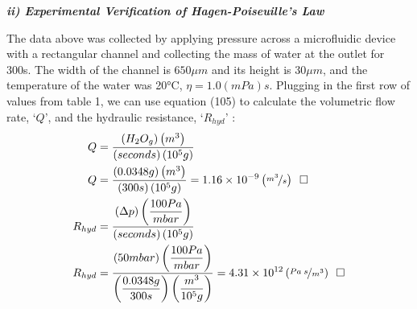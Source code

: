 \documentclass[titlepage]{article}
\begin{document}
    \newpage
    \begin{center}
        \textbf{\emph{ii) Experimental Verification of Hagen-Poiseuille’s Law}}
    \end{center}
    \begin{table}[h!]
        \centering
        \caption{\emph{Experimental Data}}
        \label{table:1}
    \end{table}
    \vspace*{0.5cm}
    \noindent The data above was collected by applying pressure across a microfluidic device with a rectangular channel and collecting the mass of water at the outlet for 300s. The width of the channel is $650$ and its height is $30$, and the temperature of the water was 20\si{\celsius}, $(mPa)s$. Plugging in the first row of values from table 1, we can use equation (105) to calculate the volumetric flow rate, `$Q$', and the hydraulic resistance, `$R_{hyd}$' :
    \begingroup
        \addtolength\jot{6pt}
        \begin{align}
            Q &= \displaystyle\frac{\left(H_{2}O_{g}\right)\left({m^3}\right)}{\left({seconds}\right)\left({10^5}g\right)} \\
            Q &= \displaystyle\frac{\left(0.0348g\right)\left(m^3\right)}{\left(300s\right)\left(10^{5}g\right)} = 1.16\times{10^{-9}} \left(\displaystyle\nicefrac{m^3}{s}\right)\hspace*{5pt}\square \\
            R_{hyd} &= \displaystyle\frac{\left(\Delta{p}\right)\left(\displaystyle\frac{100Pa}{mbar}\right)}{\left({seconds}\right)\left({10^5}g\right)}\\
            R_{hyd} &= \displaystyle\frac{\left(50mbar\right)\left(\displaystyle\frac{100Pa}{mbar}\right)}{\left(\displaystyle\frac{0.0348g}{300s}\right)\left(\displaystyle\frac{m^3}{10^5g}\right)} = 4.31\times{10^{12}} \left(\displaystyle\nicefrac{Pa\hspace*{2pt}s}{m^3} \right)\hspace*{5pt}\square
        \end{align}
\end{document}
